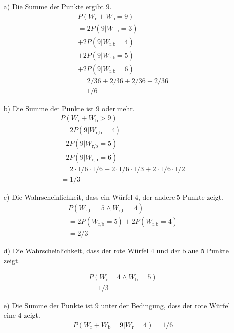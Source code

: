 \begin{itemize}
\item[a)] Die Summe der Punkte ergibt $9$. 
\begin{align*}
P(W_{\text{r}} + W_{\text{b}} = 9) \\
 = 2P(9|W_{\text{r,b}} = 3 ) \\
 + 2P(9|W_{\text{r,b}} = 4 ) \\
 + 2P(9|W_{\text{r,b}} = 5 ) \\
 + 2P(9|W_{\text{r,b}} = 6 ) \\
 = 2/36 + 2/36 + 2/36 + 2/36 \\
 = 1/6
\end{align*}

\item[b)] Die Summe der Punkte ist $9$ oder mehr.
\begin{align*}
P(W_{\text{r}} + W_{\text{b}} > 9) \\
 = 2P(9|W_{\text{r,b}} = 4 ) \\
 + 2P(9|W_{\text{r,b}} = 5 ) \\
 + 2P(9|W_{\text{r,b}} = 6 ) \\
 = 2 \cdot 1/6 \cdot 1/6 + 2 \cdot 1/6 \cdot 1/3 + 2 \cdot 1/6 \cdot 1/2 \\
 = 1/3
\end{align*}

\item[c)] Die Wahrscheinlichkeit, dass ein Würfel $4$, der andere $5$ Punkte zeigt.
\begin{align*}
P(W_{\text{r,b}} = 5 \land W_{\text{r,b}}=4)\\
= 2P(W_{\text{r,b}} = 5) + 2P(W_{\text{r,b}} = 4)\\
= 2/3
\end{align*}

\item[d)] Die Wahrscheinlichkeit, dass der rote Würfel $4$ und 
der blaue $5$ Punkte zeigt.

\begin{align*}
P(W_{\text{r}} = 4 \land W_{\text{b}}=5)\\
= 1/3
\end{align*}

\item[e)] Die Summe der Punkte ist $9$ unter der Bedingung, dass der rote Würfel eine $4$ zeigt.
\begin{align*}
P(W_{\text{r}} + W_{\text{b}} = 9|W_{\text{r}} = 4)
= 1/6
\end{align*}



\end{itemize}
